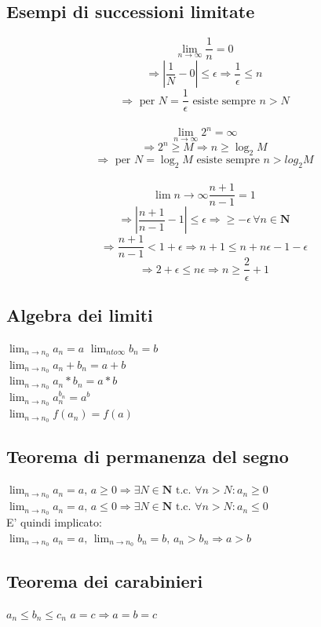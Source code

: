 \documentclass{report}
\begin{document}
    \subsection{Esempi di successioni limitate}
        $$\lim_{n \to \infty} \frac{1}{n} = 0$$ 
        $$\Longrightarrow |\frac{1}{N}-0| \leq \epsilon \Longrightarrow \frac{1}{\epsilon} \leq n$$
        $$\Longrightarrow \textrm{ per } N = \frac{1}{\epsilon} \textrm{ esiste sempre } n > N$$
        \\
        $$\lim_{n \to \infty} 2^n = \infty$$
        $$\Longrightarrow 2^n \geq M \Longrightarrow n \geq \log_2M$$
        $$\Longrightarrow \textrm{ per } N = \log_2M \textrm{ esiste sempre } n > log_2M$$ 
        \\
        $$\lim{n \to \infty} \frac{n+1}{n-1} = 1$$
        $$\Longrightarrow |\frac{n+1}{n-1} - 1| \leq \epsilon \Longrightarrow \geq -\epsilon \, \forall n \in \mathbf{N}$$
        $$\Longrightarrow \frac{n+1}{n-1} < 1 + \epsilon \Longrightarrow n+1 \leq n + n\epsilon -1 - \epsilon$$
        $$\Longrightarrow 2 + \epsilon \leq n\epsilon \Longrightarrow n \geq \frac{2}{\epsilon} + 1$$
    \subsection{Algebra dei limiti}
        $\lim_{n \to n_0} a_n = a \, \, \lim_{n to \infty} b_n = b$ \\
        $\lim_{n \to n_0} a_n + b_n = a + b$ \\
        $\lim_{n \to n_0} a_n * b_n = a * b$ \\
        $\lim_{n \to n_0} a_n^{b_n} = a^b$ \\
        $\lim_{n \to n_0} f(a_n) = f(a)$ \\
    \subsection{Teorema di permanenza del segno}
        $\lim_{n \to n_0} a_n = a, \, a \geq 0 \Longrightarrow \exists N \in \mathbf{N} \textrm{ t.c. }
            \forall n > N: a_n \geq 0$ \\
        $\lim_{n \to n_0} a_n = a, \, a \leq 0 \Longrightarrow \exists N \in \mathbf{N} \textrm{ t.c. }
            \forall n > N: a_n \leq 0$ \\
        E' quindi implicato: \\
        $\lim_{n \to n_0} a_n = a, \, \lim_{n \to n_0} b_n = b, \, a_n > b_n \Longrightarrow a > b$
    \subsection{Teorema dei carabinieri}
        $a_n \leq b_n \leq c_n$
        $a = c \Longrightarrow a = b = c$
        
\end{document}
